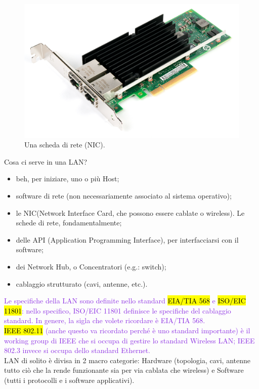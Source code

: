 \begin{figure}
 \begin{center}
 \includegraphics[width=1\linewidth]{Figures/05/nic.png}
  \end{center}
  \label{fig:nic}
  \caption{Una scheda di rete (NIC).}
\end{figure}


\noindent Cosa ci serve in una LAN?
\begin{itemize}
    \item beh, per iniziare, uno o più Host;
    \item software di rete (non necessariamente associato al sistema operativo);
    \item le NIC(Network Interface Card, che possono essere cablate o wireless). Le schede di rete, fondamentalmente;
    \item delle API (Application Programming Interface), per interfacciarsi con il software;
    \item dei Network Hub, o Concentratori (e.g.: switch);
    \item cablaggio strutturato (cavi, antenne, etc.).
\end{itemize}

\noindent\textcolor{BlueViolet}{Le specifiche della LAN sono definite nello standard \hl{EIA/TIA 568} e \hl{ISO/EIC 11801}: nello specifico, ISO/EIC 11801 definisce le specifiche del cablaggio standard. In genere, la sigla che volete ricordare è EIA/TIA 568.\\ \noindent \hl{IEEE 802.11} (anche questo va ricordato perché è uno standard importante) è il working group di IEEE che si occupa di gestire lo standard Wireless LAN; IEEE 802.3 invece si occupa dello standard Ethernet.\\}
\noindent LAN di solito è divisa in 2 macro categorie: Hardware (topologia, cavi, antenne tutto ciò che la rende funzionante sia per via cablata che wireless) e Software (tutti i protocolli e i software applicativi).


